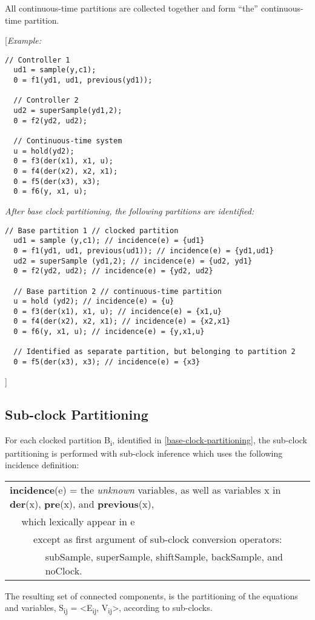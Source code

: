 All continuous-time partitions are collected together and form ``the''
continuous-time partition.

{[}\emph{Example:}
\begin{lstlisting}[language=modelica]
  // Controller 1
  ud1 = sample(y,c1);
  0 = f1(yd1, ud1, previous(yd1));

  // Controller 2
  ud2 = superSample(yd1,2);
  0 = f2(yd2, ud2);

  // Continuous-time system
  u = hold(yd2);
  0 = f3(der(x1), x1, u);
  0 = f4(der(x2), x2, x1);
  0 = f5(der(x3), x3);
  0 = f6(y, x1, u);
\end{lstlisting}

\emph{After base clock partitioning, the following partitions are
identified:}

\begin{lstlisting}[language=modelica]
  // Base partition 1 // clocked partition
  ud1 = sample (y,c1); // incidence(e) = {ud1}
  0 = f1(yd1, ud1, previous(ud1)); // incidence(e) = {yd1,ud1}
  ud2 = superSample (yd1,2); // incidence(e) = {ud2, yd1}
  0 = f2(yd2, ud2); // incidence(e) = {yd2, ud2}
  
  // Base partition 2 // continuous-time partition
  u = hold (yd2); // incidence(e) = {u}
  0 = f3(der(x1), x1, u); // incidence(e) = {x1,u}
  0 = f4(der(x2), x2, x1); // incidence(e) = {x2,x1}
  0 = f6(y, x1, u); // incidence(e) = {y,x1,u}
  
  // Identified as separate partition, but belonging to partition 2
  0 = f5(der(x3), x3); // incidence(e) = {x3}
\end{lstlisting}
{]}

\subsection{Sub-clock Partitioning}

For each clocked partition B\textsubscript{i}, identified in 
\autoref{base-clock-partitioning}, the sub-clock partitioning is performed with sub-clock inference
which uses the following incidence definition:

\begin{tabular}{p{1cm}p{1cm}p{1cm}p{12cm}}
\multicolumn{4}{p{15cm}}{\textbf{incidence}(e) = the \emph{unknown} variables, as well as
variables x in \textbf{der}(x), \textbf{pre}(x), and
\textbf{previous}(x),}\\
&\multicolumn{3}{p{14cm}}{which lexically appear in e}\\
&&\multicolumn{2}{p{13cm}}{except as first argument of sub-clock conversion operators:}\\
&&&\multicolumn{1}{p{12cm}}{subSample, superSample, shiftSample, backSample, and noClock.}
\end{tabular}
The resulting set of connected components, is the partitioning of the
equations and variables, S\textsubscript{ij} =
\textless{}E\textsubscript{ij}, V\textsubscript{ij}\textgreater{},
according to sub-clocks.

